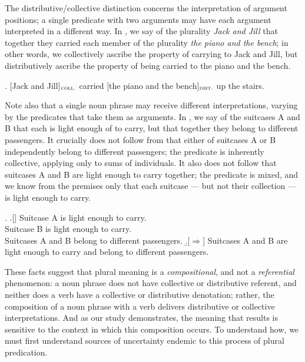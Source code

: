 \documentclass[linguex]{sp}
\newcommand{\op}{$\oplus$}
\begin{document}
The distributive/collective distinction concerns the interpretation of argument positions; a single predicate with two arguments may have each argument interpreted in a different way. In \Next, we say of the plurality \emph{Jack and Jill} that together they carried each member of the plurality \emph{the piano and the bench}; in other words, we collectively ascribe the property of carrying to Jack and Jill, but distributively ascribe the property of being carried to the piano and the bench.

\ex. [Jack and Jill]$_{\textsc{coll.}}$ carried [the piano and the bench]$_{\textsc{dist.}}$ up the stairs.

Note also that a single noun phrase may receive different interpretations, varying by the predicates that take them as arguments. In \Next, we say of the suitcases A and B that each is light enough of to carry, but that together they belong to different passengers. It crucially does not follow from \Next that either of suitcases A or B independently belong to different passengers; the predicate is inherently collective, applying only to sums of individuals. It also does not follow that suitcases A and B are light enough to carry together; the predicate is mixed, and we know from the premises only that each suitcase --- but not their collection --- is light enough to carry.

\ex. \a.[] Suitcase A is light enough to carry.\\
Suitcase B is light enough to carry.\\
Suitcases A and B belong to different passengers.
 \b.[$\Rightarrow$] Suitcases A and B are light enough to carry and belong to different passengers.
 \citep[ex.(3)]{schwarzschild1994}

These facts suggest that plural meaning is a \emph{compositional}, and not a \emph{referential} phenomenon: a noun phrase does not have collective or distributive referent, and neither does a verb have a collective or distributive denotation; rather, the composition of a noun phrase with a verb delivers distributive or collective interpretations. And as our study demonstrates, the meaning that results is sensitive to the context in which this composition occurs. To understand how, we must first understand sources of uncertainty endemic to this process of plural predication.

\end{document}
